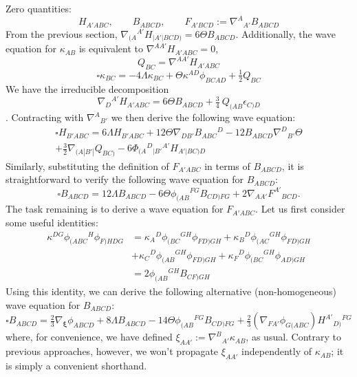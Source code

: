 \documentclass[10pt,a4paper]{article}
\theoremstyle{plain}
\begin{document}
Zero quantities:
\[H_{A'ABC}, \qquad B_{ABCD}, \qquad F_{A'BCD}:=\nabla^A{}_{A'}B_{ABCD} \]
From the previous section, $\nabla_{(A}{}^{A'}H_{\vert A'\vert BCD)} = 6\Theta B_{ABCD}$. Additionally, the wave equation for $\kappa_{AB}$ is equivalent to $\nabla^{AA'}H_{A'ABC}=0$, 
\[ Q_{BC} = \nabla^{AA'}H_{A'ABC}\]
\[ \square \kappa_{BC} = -4 \Lambda\kappa_{BC}  + \Theta \kappa^{AD} \phi_{BCAD} + \tfrac{1}{2} Q_{BC}\]
We have the irreducible decomposition
\begin{equation}
     \nabla_{D}{}^{A'}H_{A'ABC} = 6 \Theta B_{ABCD} + \tfrac{3}{4} \
Q_{(AB}\epsilon_{C)D}\label{IrrDecompCurlOfH}
\end{equation}
. Contracting with $\nabla^A{}_{B'}$ we then derive the following wave equation:
\begin{multline}
    \square H_{B'ABC} = 6 \Lambda H_{B'ABC} + 12 \Theta \nabla_{DB'}B_{ABC}{}^{D} - 12 B_{ABCD} \nabla^{D}{}_{B'}\Theta \\+ \tfrac{3}{2} \nabla_{(A|B'|}Q_{BC)} - 6 \Phi_{(A}{}^{D}{}_{|B'}{}^{A'}H_{A'|BC)D}
\end{multline}
Similarly, substituting the definition of $F_{A'ABC}$ in terms of $B_{ABCD}$, it is straightforward to verify the following wave equation for $B_{ABCD}$: 
\begin{equation}
     \square B_{ABCD} = 12\Lambda B_{ABCD} - 6\Theta \phi_{(AB}{}^{FG}B_{CD)FG} + 2\nabla_{AA'}F^{A'}{}_{BCD}. \label{Eq:FirstWaveEqForB}
\end{equation}
The task remaining is to derive a wave equation for $F_{A'ABC}$. Let us first consider some useful identities:
\begin{align}
     \kappa^{DG}\phi_{(ABC}{}^H\phi_{F)HDG}&=\kappa_A{}^D\phi_{(BC}{}^{GH}\phi_{FD)GH}+\kappa_B{}^D\phi_{(AC}{}^{GH}\phi_{FD)GH}\nonumber\\
    &+\kappa_C{}^D\phi_{(AB}{}^{GH}\phi_{FD)GH}+\kappa_F{}^D\phi_{(BC}{}^{GH}\phi_{AD)GH} \nonumber\\
    & =2\phi_{(AB}{}^{GH}B_{CF)GH}
\end{align}
Using this identity, we can derive the following alternative (non-homogeneous) wave equation for $B_{ABCD}$:
\begin{equation}
    \square B_{ABCD} = \tfrac{2}{3}\nabla_{\bm\xi}\phi_{ABCD} + 8\Lambda B_{ABCD} - 14\Theta \phi_{(AB}{}^{FG}B_{CD)FG} + \tfrac{2}{3}(\nabla_{FA'}\phi_{G(ABC})H^{A'}{}_{D)}{}^{FG}\label{Eq:SecondWaveEqForB}
\end{equation}
where, for convenience, we have defined $\xi_{AA'}:=\nabla^B{}_{A'}\kappa_{AB}$, as usual. Contrary to previous approaches, however, we won't propagate $\xi_{AA'}$ independently of $\kappa_{AB}$; it is simply a convenient shorthand. 
\end{document}
